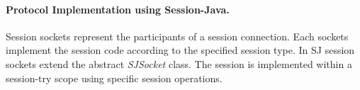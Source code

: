 \documentclass{llncs}
\begin{document}
\paragraph{Protocol Implementation using Session-Java.}
Session sockets represent the participants of a session connection.
Each sockets implement the session code according to the specified session type.
In SJ session sockets extend the abstract \textit{SJSocket} class. %
The session is implemented within a session-try scope using specific session operations. %

\end{document}
